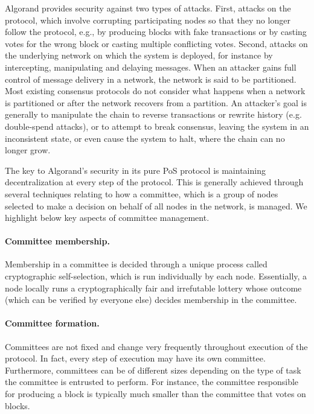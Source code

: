 Algorand provides security against two types of attacks.
First, attacks on the protocol, which involve corrupting participating nodes so that they no longer follow the protocol, e.g., by producing blocks with fake transactions or by casting votes for the wrong block or casting multiple conflicting votes. 
Second, attacks on the underlying network on which the system is deployed, for instance by intercepting, manipulating and delaying messages. When an attacker gains full control of message delivery in a network, the network is said to be partitioned. Most existing consensus protocols do not consider what happens when a network is partitioned or after the network recovers from a partition.
An attacker's goal is generally to manipulate the chain to reverse transactions or rewrite history (e.g. double-spend attacks), or to attempt to break consensus, leaving the system in an inconsistent state, or even cause the system to halt, where the chain can no longer grow.

The key to Algorand's security in its pure PoS protocol is maintaining decentralization at every step of the protocol. This is generally achieved through several techniques relating to how a committee, which is a group of nodes selected to make a decision on behalf of all nodes in the network, is managed. We highlight below key aspects of committee management.

\paragraph{Committee membership.} Membership in a committee is decided through a unique process called cryptographic self-selection, which is run individually by each node. Essentially, a node locally runs a cryptographically fair and irrefutable lottery whose outcome (which can be verified by everyone else) decides membership in the committee.

\paragraph{Committee formation.} Committees are not fixed and change very frequently throughout execution of the protocol. In fact, every step of execution may have its own committee. Furthermore, committees can be of different sizes depending on the type of task the committee is entrusted to perform. For instance, the committee responsible for producing a block is typically much smaller than the committee that votes on blocks.

